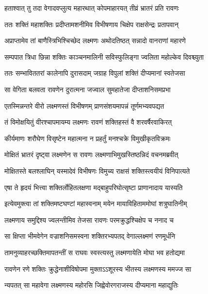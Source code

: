 \twolineshloka
{हताश्वात् तु तदा वेगादवप्लुत्य महारथात्}
{कोपमाहारयत् तीव्रं भ्रातरं प्रति रावणः} %

\twolineshloka
{ततः शक्तिं महाशक्तिः प्रदीप्तामशनीमिव}
{विभीषणाय चिक्षेप राक्षसेन्द्रः प्रतापवान्} %

\twolineshloka
{अप्राप्तामेव तां बाणैस्त्रिभिश्चिच्छेद लक्ष्मणः}
{अथोदतिष्ठत् सन्नादो वानराणां महारणे} %

\twolineshloka
{सम्पपात त्रिधा छिन्ना शक्तिः काञ्चनमालिनी}
{सविस्फुलिङ्गा ज्वलिता महोल्केव दिवश्च्युता} %

\twolineshloka
{ततः सम्भाविततरां कालेनापि दुरासदाम्}
{जग्राह विपुलां शक्तिं दीप्यमानां स्वतेजसा} %

\twolineshloka
{सा वेगिता बलवता रावणेन दुरात्मना}
{जज्वाल सुमहातेजा दीप्ताशनिसमप्रभा} %

\twolineshloka
{एतस्मिन्नन्तरे वीरो लक्ष्मणस्तं विभीषणम्}
{प्राणसंशयमापन्नं तूर्णमभ्यवपद्यत} %

\twolineshloka
{तं विमोक्षयितुं वीरश्चापमायम्य लक्ष्मणः}
{रावणं शक्तिहस्तं वै शरवर्षैरवाकिरत्} %

\twolineshloka
{कीर्यमाणः शरौघेण विसृष्टेन महात्मना}
{न प्रहर्तुं मनश्चक्रे विमुखीकृतविक्रमः} %

\twolineshloka
{मोक्षितं भ्रातरं दृष्ट्वा लक्ष्मणेन स रावणः}
{लक्ष्मणाभिमुखस्तिष्ठन्निदं वचनमब्रवीत्} %

\twolineshloka
{मोक्षितस्ते बलश्लाघिन् यस्मादेवं विभीषणः}
{विमुच्य राक्षसं शक्तिस्त्वयीयं विनिपात्यते} %

\twolineshloka
{एषा ते हृदयं भित्त्वा शक्तिर्लोहितलक्षणा}
{मद्बाहुपरिघोत्सृष्टा प्राणानादाय यास्यति} %

\twolineshloka
{इत्येवमुक्त्वा तां शक्तिमष्टघण्टां महास्वनाम्}
{मयेन मायाविहिताममोघां शत्रुघातिनीम्} %

\twolineshloka
{लक्ष्मणाय समुद्दिश्य ज्वलन्तीमिव तेजसा}
{रावणः परमक्रुद्धश्चिक्षेप च ननाद च} %

\twolineshloka
{सा क्षिप्ता भीमवेगेन वज्राशनिसमस्वना}
{शक्तिरभ्यपतद् वेगाल्लक्ष्मणं रणमूर्धनि} %

\twolineshloka
{तामनुव्याहरच्छक्तिमापतन्तीं स राघवः}
{स्वस्त्यस्तु लक्ष्मणायेति मोघा भव हतोद्यमा} %

\twolineshloka
{रावणेन रणे शक्तिः क्रुद्धेनाशीविषोपमा}
{मुक्ताऽऽशूरस्य भीतस्य लक्ष्मणस्य ममज्ज सा} %

\twolineshloka
{न्यपतत् सा महावेगा लक्ष्मणस्य महोरसि}
{जिह्वेवोरगराजस्य दीप्यमाना महाद्युतिः} %


